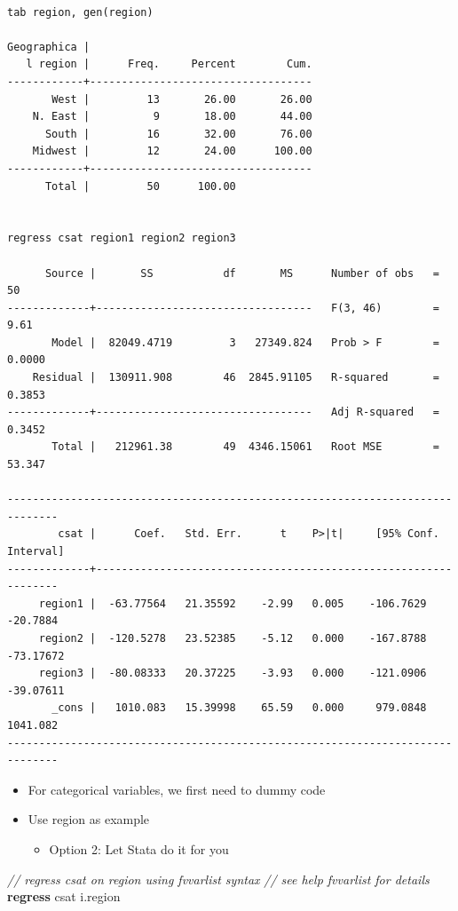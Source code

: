\documentclass[
]{book}
\newenvironment{Shaded}{\begin{snugshade}}{\end{snugshade}}
\newcommand{\CommentTok}[1]{\textcolor[rgb]{0.56,0.35,0.01}{\textit{#1}}}
\newcommand{\KeywordTok}[1]{\textcolor[rgb]{0.13,0.29,0.53}{\textbf{#1}}}
\newcommand{\NormalTok}[1]{#1}
\providecommand{\tightlist}{%
  \setlength{\itemsep}{0pt}\setlength{\parskip}{0pt}}
\begin{document}
\begin{verbatim}

tab region, gen(region)

Geographica |
   l region |      Freq.     Percent        Cum.
------------+-----------------------------------
       West |         13       26.00       26.00
    N. East |          9       18.00       44.00
      South |         16       32.00       76.00
    Midwest |         12       24.00      100.00
------------+-----------------------------------
      Total |         50      100.00


regress csat region1 region2 region3

      Source |       SS           df       MS      Number of obs   =        50
-------------+----------------------------------   F(3, 46)        =      9.61
       Model |  82049.4719         3   27349.824   Prob > F        =    0.0000
    Residual |  130911.908        46  2845.91105   R-squared       =    0.3853
-------------+----------------------------------   Adj R-squared   =    0.3452
       Total |   212961.38        49  4346.15061   Root MSE        =    53.347

------------------------------------------------------------------------------
        csat |      Coef.   Std. Err.      t    P>|t|     [95% Conf. Interval]
-------------+----------------------------------------------------------------
     region1 |  -63.77564   21.35592    -2.99   0.005    -106.7629    -20.7884
     region2 |  -120.5278   23.52385    -5.12   0.000    -167.8788   -73.17672
     region3 |  -80.08333   20.37225    -3.93   0.000    -121.0906   -39.07611
       _cons |   1010.083   15.39998    65.59   0.000     979.0848    1041.082
------------------------------------------------------------------------------
\end{verbatim}

\begin{itemize}
\tightlist
\item
  For categorical variables, we first need to dummy code
\item
  Use region as example

  \begin{itemize}
  \tightlist
  \item
    Option 2: Let Stata do it for you
  \end{itemize}
\end{itemize}

\begin{Shaded}
\begin{Highlighting}[]
  \CommentTok{// regress csat on region using fvvarlist syntax}
  \CommentTok{// see help fvvarlist for details}
  \KeywordTok{regress}\NormalTok{ csat i.region}
\end{Highlighting}
\end{Shaded}
\end{document}
